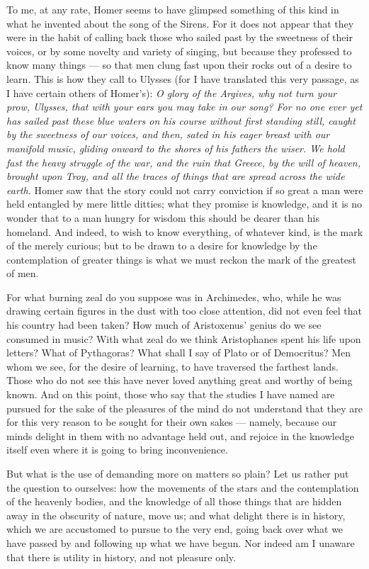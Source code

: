  To me, at any rate, Homer seems to have glimpsed something of this kind in what he invented about the song of the Sirens. For it does not appear that they were in the habit of calling back those who sailed past by the sweetness of their voices, or by some novelty and variety of singing, but because they professed to know many things — so that men clung fast upon their rocks out of a desire to learn. This is how they call to Ulysses (for I have translated this very passage, as I have certain others of Homer's): \textit{O glory of the Argives, why not turn your prow, Ulysses, that with your ears you may take in our song? For no one ever yet has sailed past these blue waters on his course without first standing still, caught by the sweetness of our voices, and then, sated in his eager breast with our manifold music, gliding onward to the shores of his fathers the wiser. We hold fast the heavy struggle of the war, and the ruin that Greece, by the will of heaven, brought upon Troy, and all the traces of things that are spread across the wide earth.} Homer saw that the story could not carry conviction if so great a man were held entangled by mere little ditties; what they promise is knowledge, and it is no wonder that to a man hungry for wisdom this should be dearer than his homeland. And indeed, to wish to know everything, of whatever kind, is the mark of the merely curious; but to be drawn to a desire for knowledge by the contemplation of greater things is what we must reckon the mark of the greatest of men.

 For what burning zeal do you suppose was in Archimedes, who, while he was drawing certain figures in the dust with too close attention, did not even feel that his country had been taken? How much of Aristoxenus' genius do we see consumed in music? With what zeal do we think Aristophanes spent his life upon letters? What of Pythagoras? What shall I say of Plato or of Democritus? Men whom we see, for the desire of learning, to have traversed the farthest lands. Those who do not see this have never loved anything great and worthy of being known. And on this point, those who say that the studies I have named are pursued for the sake of the pleasures of the mind do not understand that they are for this very reason to be sought for their own sakes — namely, because our minds delight in them with no advantage held out, and rejoice in the knowledge itself even where it is going to bring inconvenience.

 But what is the use of demanding more on matters so plain? Let us rather put the question to ourselves: how the movements of the stars and the contemplation of the heavenly bodies, and the knowledge of all those things that are hidden away in the obscurity of nature, move us; and what delight there is in history, which we are accustomed to pursue to the very end, going back over what we have passed by and following up what we have begun. Nor indeed am I unaware that there is utility in history, and not pleasure only.

